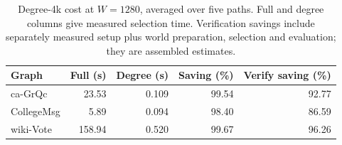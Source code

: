 \begin{table}[htbp]
\caption{Degree-4k cost at $W=1280$, averaged over five paths. Full and degree columns give measured selection time. Verification savings include separately measured setup plus world preparation, selection and evaluation; they are assembled estimates.}\label{tab:cost}
\begin{tabular}{lrrrr}
\toprule
Graph & Full (s) & Degree (s) & Saving (\%) & Verify saving (\%) \\
\midrule
ca-GrQc & 23.53 & 0.109 & 99.54 & 92.77 \\
CollegeMsg & 5.89 & 0.094 & 98.40 & 86.59 \\
wiki-Vote & 158.94 & 0.520 & 99.67 & 96.26 \\
\bottomrule
\end{tabular}
\end{table}
